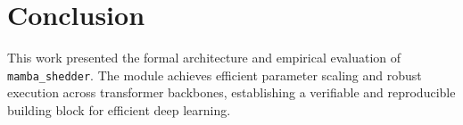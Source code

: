 \section{Conclusion}
This work presented the formal architecture and empirical evaluation of \texttt{mamba_shedder}. The module achieves efficient parameter scaling and robust execution across transformer backbones, establishing a verifiable and reproducible building block for efficient deep learning.
